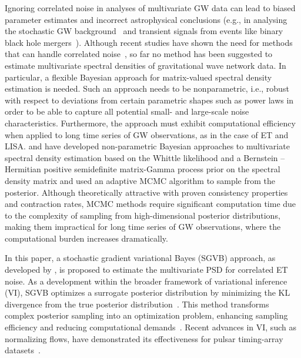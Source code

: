 \documentclass[%
 reprint,
 amsmath,amssymb,
 aps,
 nofootinbib,
]{revtex4-2}
\begin{document}
Ignoring correlated noise in analyses of multivariate \ac{GW} data can lead to biased parameter estimates and incorrect astrophysical conclusions (e.g., in analysing the stochastic \ac{GW} background~\cite{Thrane_correlations_SGWB, Christensen_2019_SGWB, boileau2022figures} and transient signals from events like binary black hole mergers~\cite{Cireddu:2023:arXiv}). 
Although recent studies have shown the need for methods that can handle correlated noise~\cite{Cireddu:2023:arXiv,JanssensKamiel2023Ffps}, so far no method has been suggested to estimate  multivariate spectral densities  of gravitational wave network data. 
In particular, a flexible Bayesian approach for matrix-valued spectral density estimation is needed. 
Such an approach needs to be nonparametric, i.e., robust with respect to deviations from certain parametric shapes such as power laws in order to be able to capture all potential small- and large-scale noise characteristics.
Furthermore, the approach must exhibit computational efficiency when applied to long time series of \ac{GW} observations, as in the case of ET and LISA. 
\citet{MeierAlexander2020Bnao} and \citet{Liu2023} have developed non-parametric Bayesian approaches to multivariate spectral density estimation based on the Whittle likelihood and a Bernstein -- Hermitian positive semidefinite matrix-Gamma process prior on the spectral density matrix and used an adaptive MCMC algorithm to sample from the posterior. 
Although theoretically attractive with proven consistency properties and contraction rates, MCMC methods require significant computation time due to the complexity of sampling from high-dimensional posterior distributions, making them impractical for long time series of \ac{GW} observations, where the computational burden increases dramatically.


In this paper, a stochastic gradient variational Bayes (SGVB) approach, as developed by \citet{Hu2023}, is proposed to estimate the multivariate \ac{PSD} for correlated \ac{ET} noise. As a development within the broader framework of variational inference (VI), SGVB optimizes a surrogate posterior distribution by minimizing the \ac{KL} divergence from the true posterior distribution~\cite{Jordan1999,Wainwright2008,Blei2017}.  
This method transforms complex posterior sampling into an optimization problem, enhancing sampling efficiency and reducing computational demands~\cite{Blei2006,kingma2022}.
Recent advances in VI, such as normalizing flows, have demonstrated its effectiveness for pulsar timing-array datasets~\cite{Vallisneri2024}. 
\end{document}
